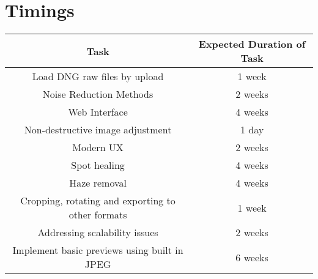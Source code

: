 \documentclass[14pt]{article}
\begin{document}
\section{Timings}
  \begin{center}
	  \begin{tabular}{| c | c |}
		  \hline
		  Task & Expected Duration of Task \\
		  \hline
		  Load DNG raw files by upload & 1 week\\
		  Noise Reduction Methods & 2 weeks\\
		  Web Interface & 4 weeks\\
		  Non-destructive image adjustment & 1 day\\
		  Modern UX & 2 weeks\\
		  Spot healing & 4 weeks\\
		  Haze removal & 4 weeks\\
		  Cropping, rotating and exporting to other formats & 1 week\\
		  Addressing scalability issues & 2 weeks\\
		  Implement basic previews using built in JPEG & 6 weeks\\
		  \hline
	\end{tabular}
  \end{center}


\end{document}
